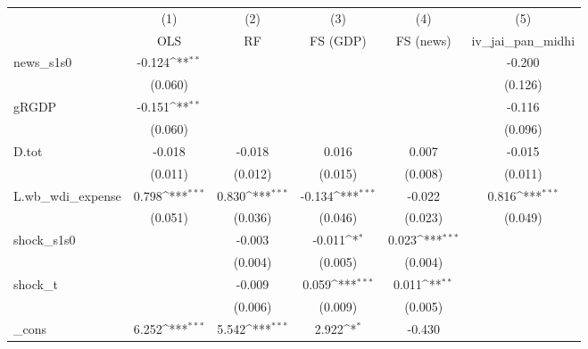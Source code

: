 {
\def\sym#1{\ifmmode^{#1}\else\(^{#1}\)\fi}
\begin{tabular}{l*{5}{c}}
\toprule
            &\multicolumn{1}{c}{(1)}&\multicolumn{1}{c}{(2)}&\multicolumn{1}{c}{(3)}&\multicolumn{1}{c}{(4)}&\multicolumn{1}{c}{(5)}\\
            &\multicolumn{1}{c}{OLS}&\multicolumn{1}{c}{RF}&\multicolumn{1}{c}{FS (GDP)}&\multicolumn{1}{c}{FS (news)}&\multicolumn{1}{c}{iv\_jai\_pan\_midhi}\\
\midrule
news\_s1s0   &      -0.124\sym{**} &                     &                     &                     &      -0.200         \\
            &     (0.060)         &                     &                     &                     &     (0.126)         \\
\addlinespace
gRGDP       &      -0.151\sym{**} &                     &                     &                     &      -0.116         \\
            &     (0.060)         &                     &                     &                     &     (0.096)         \\
\addlinespace
D.tot       &      -0.018         &      -0.018         &       0.016         &       0.007         &      -0.015         \\
            &     (0.011)         &     (0.012)         &     (0.015)         &     (0.008)         &     (0.011)         \\
\addlinespace
L.wb\_wdi\_expense&       0.798\sym{***}&       0.830\sym{***}&      -0.134\sym{***}&      -0.022         &       0.816\sym{***}\\
            &     (0.051)         &     (0.036)         &     (0.046)         &     (0.023)         &     (0.049)         \\
\addlinespace
shock\_s1s0  &                     &      -0.003         &      -0.011\sym{*}  &       0.023\sym{***}&                     \\
            &                     &     (0.004)         &     (0.005)         &     (0.004)         &                     \\
\addlinespace
shock\_t     &                     &      -0.009         &       0.059\sym{***}&       0.011\sym{**} &                     \\
            &                     &     (0.006)         &     (0.009)         &     (0.005)         &                     \\
\addlinespace
\_cons      &       6.252\sym{***}&       5.542\sym{***}&       2.922\sym{*}  &      -0.430         &                     \\

\end{tabular}}
